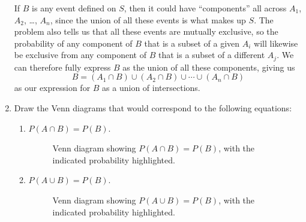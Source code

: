 \documentclass{article}
\begin{document}
\begin{enumerate}
\begin{solution}
        If \(B\) is any event defined on \(S\), then it could have ``components'' all across \(A_1\), \(A_2\), \ldots, \(A_n\), since the union of all these events is what makes up \(S\). 
        The problem also tells us that all these events are mutually exclusive, so the probability of any component of \(B\) that is a subset of a given \(A_i\) will likewise be exclusive 
        from any component of \(B\) that is a subset of a different \(A_j\). We can therefore fully express \(B\) as the union of all these components, giving us\[
            B = (A_1\cap{}B)\cup(A_2\cap{}B)\cup\cdots\cup(A_n\cap{}B)
        \]as our expression for \(B\) as a union of intersections. 
    \end{solution}
    \item Draw the Venn diagrams that would correspond to the following equations:\begin{enumerate}
        \item \(P(A\cap{}B) = P(B)\).\begin{figure}[h]
            \centering
            \caption{Venn diagram showing \(P(A\cap{}B) = P(B)\), with the indicated probability highlighted.}
        \end{figure}
        \item \(P(A\cup{}B) = P(B)\).\begin{figure}[h]
            \centering
            \caption{Venn diagram showing \(P(A\cup{}B) = P(B)\), with the indicated probability highlighted.}

\end{figure}
\end{enumerate}
\end{enumerate}
\end{document}
